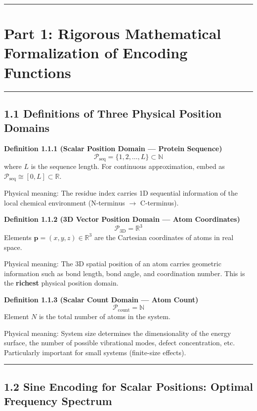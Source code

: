 \documentclass[
  12pt,
]{article}
\begin{document}
\begin{center}\rule{0.5\linewidth}{0.5pt}\end{center}

\section{Part 1: Rigorous Mathematical Formalization of Encoding Functions}\label{part-1-encoding-functions}

\begin{center}\rule{0.5\linewidth}{0.5pt}\end{center}

\subsection{1.1 Definitions of Three Physical Position Domains}\label{three-physical-position-domains}

\textbf{Definition 1.1.1 (Scalar Position Domain --- Protein Sequence)}
\[\mathcal{P}_{\text{seq}} = \{1, 2, \ldots, L\} \subset \mathbb{N}\]
where $L$ is the sequence length. For continuous approximation, embed as $\mathcal{P}_{\text{seq}} \cong [0, L] \subset \mathbb{R}$.

Physical meaning: The residue index carries 1D sequential information of the local chemical environment (N-terminus $\to$ C-terminus).

\textbf{Definition 1.1.2 (3D Vector Position Domain --- Atom Coordinates)}
\[\mathcal{P}_{\text{3D}} = \mathbb{R}^3\]
Elements $\mathbf{p} = (x, y, z) \in \mathbb{R}^3$ are the Cartesian coordinates of atoms in real space.

Physical meaning: The 3D spatial position of an atom carries geometric information such as bond length, bond angle, and coordination number. This is the \textbf{richest} physical position domain.

\textbf{Definition 1.1.3 (Scalar Count Domain --- Atom Count)}
\[\mathcal{P}_{\text{count}} = \mathbb{N}\]
Element $N$ is the total number of atoms in the system.

Physical meaning: System size determines the dimensionality of the energy surface, the number of possible vibrational modes, defect concentration, etc. Particularly important for small systems (finite-size effects).

\begin{center}\rule{0.5\linewidth}{0.5pt}\end{center}

\subsection{1.2 Sine Encoding for Scalar Positions: Optimal Frequency Spectrum}\label{sine-encoding-optimal-spectrum}
\end{document}
